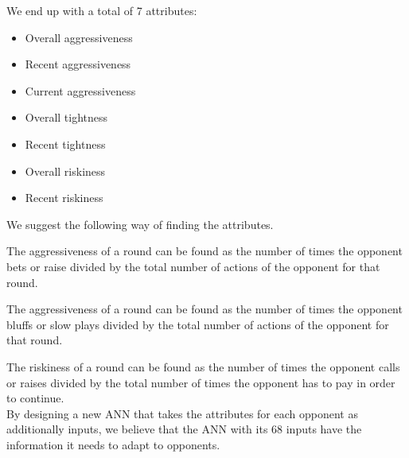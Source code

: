 We end up with a total of 7 attributes:
\begin{itemize}
\item Overall aggressiveness
\item Recent aggressiveness
\item Current aggressiveness
\item Overall tightness
\item Recent tightness
\item Overall riskiness
\item Recent riskiness
\end{itemize}

We suggest the following way of finding the attributes.

The aggressiveness of a round can be found as the number of times the opponent bets or raise divided by the total number of actions of the opponent for that round.

The aggressiveness of a round can be found as the number of times the opponent bluffs or slow plays divided by the total number of actions of the opponent for that round.

The riskiness of a round can be found as the number of times the opponent calls or raises divided by the total number of times the opponent has to pay in order to continue.\\


By designing a new ANN that takes the attributes for each opponent as additionally inputs, we believe that the ANN with its 68 inputs have the information it needs to adapt to opponents.
